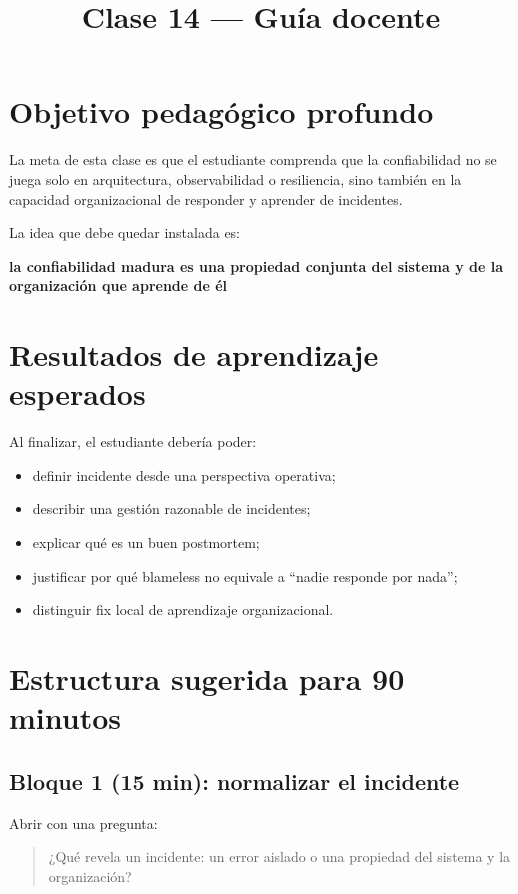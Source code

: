 \documentclass[variant=docente,cover=institutional,mode=screen]{ua-engineering-v6-article}
\title{Clase 14 --- Guía docente}
\author{\UAProfessor}
\date{\UADate}
\begin{document}
\maketitle

\section{Objetivo pedagógico profundo}

La meta de esta clase es que el estudiante comprenda que la confiabilidad no se juega solo en arquitectura, observabilidad o resiliencia, sino también en la capacidad organizacional de responder y aprender de incidentes.

La idea que debe quedar instalada es:

\begin{center}
\textbf{la confiabilidad madura es una propiedad conjunta del sistema y de la organización que aprende de él}
\end{center}

\section{Resultados de aprendizaje esperados}

Al finalizar, el estudiante debería poder:

\begin{itemize}
\item definir incidente desde una perspectiva operativa;
\item describir una gestión razonable de incidentes;
\item explicar qué es un buen postmortem;
\item justificar por qué blameless no equivale a “nadie responde por nada”;
\item distinguir fix local de aprendizaje organizacional.
\end{itemize}

\section{Estructura sugerida para 90 minutos}

\subsection*{Bloque 1 (15 min): normalizar el incidente}
Abrir con una pregunta:
\begin{quote}
¿Qué revela un incidente: un error aislado o una propiedad del sistema y la organización?
\end{quote}
\end{document}

